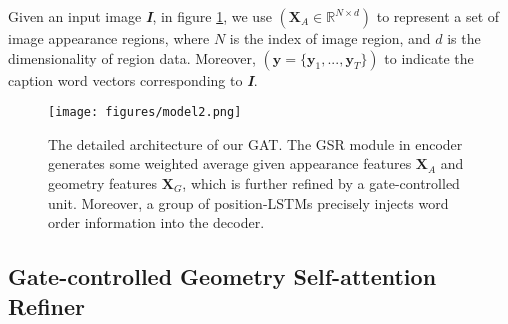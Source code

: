 \documentclass[review]{elsarticle}
\begin{document}
Given an input image \textbf{\emph{I}}, in figure \ref{fig:enc-dec}, we use $(\bm{X}_A \in \mathbb{R}^{N \times d})$ to represent a set of image appearance regions, where $N$ is the index of image region, and $d$ is the dimensionality of region data. Moreover, $(\bm{y} = \{\bm{y}_1, ..., \bm{y}_T\})$ to indicate the caption word vectors corresponding to \textbf{\textit{I}}.

\begin{figure}[htb]
  \begin{center}
    \texttt{[image: figures/model2.png]}
  \end{center}
  \caption{The detailed architecture of our GAT. The GSR module in encoder generates some weighted average given appearance features \(\bm{X}_A\) and geometry features \(\bm{X}_G\), which is further refined by a gate-controlled unit. Moreover, a group of position-LSTMs precisely injects word order information into the decoder.}
  \label{fig:enc-dec}
\end{figure}


\subsection{Gate-controlled Geometry Self-attention Refiner}

\end{document}
